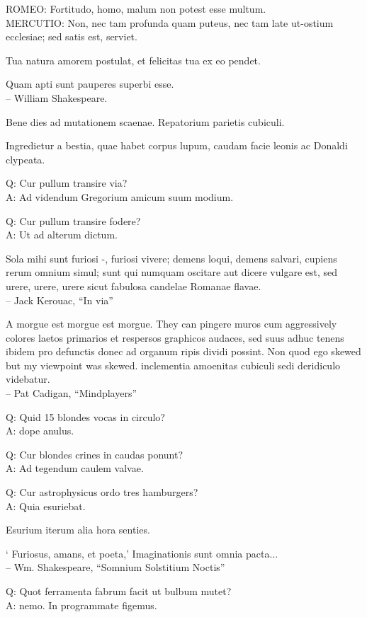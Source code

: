\documentclass[titlepage,12pt]{memoir}
\begin{document}
ROMEO: Fortitudo, homo, malum non potest esse multum.\\
MERCUTIO: Non, nec tam profunda quam puteus, nec tam late
ut-ostium ecclesiae; sed satis est, serviet.

Tua natura amorem postulat, et felicitas tua ex eo pendet.

Quam apti sunt pauperes superbi esse.
\\-- William Shakespeare.

Bene dies ad mutationem scaenae. Repatorium parietis cubiculi.

Ingredietur a bestia, quae habet corpus lupum, caudam
facie leonis ac Donaldi clypeata.

Q: Cur pullum transire via?\\
A: Ad videndum Gregorium amicum suum modium.

Q: Cur pullum transire fodere?\\
A: Ut ad alterum dictum.

Sola mihi sunt furiosi -, furiosi vivere;
demens loqui, demens salvari, cupiens rerum omnium simul;
sunt qui numquam oscitare aut dicere vulgare est, sed urere, urere, urere
sicut fabulosa candelae Romanae flavae.
\\-- Jack Kerouac, “In via”

A morgue est morgue est morgue. They can pingere muros cum aggressively
colores laetos primarios et respersos graphicos audaces, sed suus adhuc tenens
ibidem pro defunctis donec ad organum ripis dividi possint. Non quod ego
skewed but my viewpoint was skewed. inclementia
amoenitas cubiculi sedi deridiculo videbatur.
\\-- Pat Cadigan, “Mindplayers”

Q: Quid 15 blondes vocas in circulo?\\
A: dope anulus.

Q: Cur blondes crines in caudas ponunt?\\
A: Ad tegendum caulem valvae.

Q: Cur astrophysicus ordo tres hamburgers?\\
A: Quia esuriebat.

Esurium iterum alia hora senties.

‘ Furiosus, amans, et poeta,’
Imaginationis sunt omnia pacta...
\\-- Wm. Shakespeare, “Somnium Solstitium Noctis”

Q: Quot ferramenta fabrum facit ut bulbum mutet?\\
A: nemo. In programmate figemus.
\end{document}
